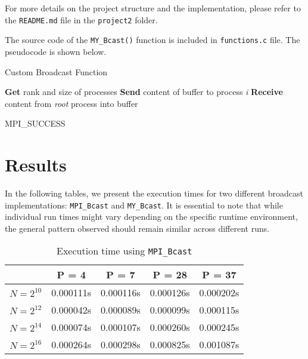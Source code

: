 \documentclass[12pt,a4paper]{article}
\begin{document}
For more details on the project structure and the implementation, please refer to the \texttt{README.md} file in the \texttt{project2} folder.

The source code of the \texttt{MY\_Bcast()} function is included in \texttt{functions.c} file. 
The pseudocode is shown below.
\begin{algorithm}
    \caption{Custom Broadcast Function}
    \begin{algorithmic}[1]
    \State \textbf{Get} rank and size of processes
                \State \textbf{Send} content of buffer to process \textit{i}
            \EndFor
        \Else
            \State \textbf{Receive} content from \textit{root} process into buffer
        \EndIf
        
        \State \Return MPI\_SUCCESS
    \EndProcedure
    \end{algorithmic}
\end{algorithm}


\section{Results}

In the following tables, 
we present the execution times for two different broadcast implementations: 
\texttt{MPI\_Bcast} and \texttt{MY\_Bcast}. 
It is essential to note that while individual run times might vary depending on the specific runtime environment, 
the general pattern observed should remain similar across different runs.

\begin{table}[!htb]
    \centering
    \begin{tabular}{|c|c|c|c|c|}
    \hline
     & P = 4 & P = 7 & P = 28 & P = 37 \\ 
    \hline
    $N = 2^{10}$ & 0.000111s & 0.000116s & 0.000126s & 0.000202s \\ 
    \hline
    $N = 2^{12}$ & 0.000042s & 0.000089s & 0.000099s & 0.000115s \\ 
    \hline
    $N = 2^{14}$ & 0.000074s & 0.000107s & 0.000260s & 0.000245s \\ 
    \hline
    $N = 2^{16}$ & 0.000264s & 0.000298s & 0.000825s & 0.001087s \\ 
    \hline
    \end{tabular}
    \caption{Execution time using \texttt{MPI\_Bcast}}
\end{table}
\end{document}
